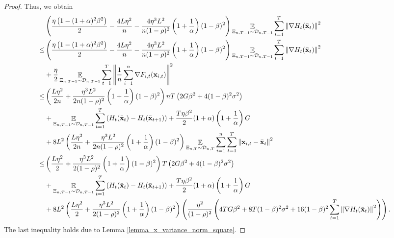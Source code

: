 \documentclass{article}
\begin{document}
\begin{proof}
Thus, we obtain
\begin{align}
\nonumber
& \left( \frac{\eta\left(  1-(1+\alpha)^2\beta^2  \right)}{2} - \frac{4L\eta^2}{n} - \frac{4\eta^3 L^2}{n(1-\rho)^2} \left( 1+\frac{1}{\alpha} \right)(1-\beta)^2 \right) \mathop{\mathbb{E}}_{ \Xi_{n,T-1} \sim \mathcal{D}_{n,T-1} }\sum_{t=1}^T\left\lVert\nabla H_t(\bar{{\bf x}}_t)\right\rVert^2 \\ \nonumber 
\le & \left( \frac{\eta\left(  1-(1+\alpha)^2\beta^2  \right)}{2} - \frac{4L\eta^2}{n} - \frac{4\eta^3 L^2}{n(1-\rho)^2} \left( 1+\frac{1}{\alpha} \right)(1-\beta)^2 \right) \mathop{\mathbb{E}}_{ \Xi_{n,T-1} \sim \mathcal{D}_{n,T-1} }\sum_{t=1}^T\left\lVert\nabla H_t(\bar{{\bf x}}_t)\right\rVert^2 \\ \nonumber 
&+ \frac{\eta}{2}  \mathop{\mathbb{E}}_{ \Xi_{n,T-1} \sim \mathcal{D}_{n,T-1} }\sum_{t=1}^T\left\lVert\frac{1}{n}\sum_{i=1}^n \nabla F_{i,t}({\bf x}_{i,t})\right\rVert^2 \\ \nonumber 
\le &  \left( \frac{L\eta^2}{2n} + \frac{\eta^3 L^2}{2n(1-\rho)^2} \left( 1+\frac{1}{\alpha} \right)(1-\beta)^2  \right) n T \left(  2G\beta^2  +  4(1-\beta)^2 \sigma^2  \right) \\ \nonumber
& + \mathop{\mathbb{E}}_{ \Xi_{n,T-1} \sim \mathcal{D}_{n,T-1} } \sum_{t=1}^T \left(  H_t(\bar{{\bf x}}_t) -  H_t(\bar{{\bf x}}_{t+1})  \right) + \frac{T \eta \beta^2}{2} (1+\alpha) \left( 1+\frac{1}{\alpha} \right)  G \\ \nonumber
& + 8L^2\left( \frac{L\eta^2}{2n} + \frac{\eta^3 L^2}{2n(1-\rho)^2} \left( 1+\frac{1}{\alpha} \right)(1-\beta)^2  \right) \mathop{\mathbb{E}}_{ \Xi_{n,T} \sim \mathcal{D}_{n,T} } \sum_{i=1}^n \sum_{t=1}^T \left\lVert {\bf x}_{i,t} - \bar{{\bf x}}_t \right\rVert^2  \\ \nonumber
\le &  \left( \frac{L\eta^2}{2} + \frac{\eta^3 L^2}{2(1-\rho)^2} \left( 1+\frac{1}{\alpha} \right)(1-\beta)^2  \right)  T \left(  2G\beta^2  +  4(1-\beta)^2 \sigma^2  \right) \\ \nonumber
& + \mathop{\mathbb{E}}_{ \Xi_{n,T-1} \sim \mathcal{D}_{n,T-1} } \sum_{t=1}^T \left(  H_t(\bar{{\bf x}}_t) -  H_t(\bar{{\bf x}}_{t+1})  \right) + \frac{T \eta \beta^2}{2} (1+\alpha) \left( 1+\frac{1}{\alpha} \right)  G \\ \nonumber
& + 8L^2\left( \frac{L\eta^2}{2} + \frac{\eta^3 L^2}{2(1-\rho)^2} \left( 1+\frac{1}{\alpha} \right)(1-\beta)^2  \right) \left(  \frac{\eta^2}{(1-\rho)^2} \left(  4TG\beta^2  +  8T(1-\beta)^2 \sigma^2 + 16(1-\beta)^2 \sum_{t=1}^T \left\lVert\nabla H_t(\bar{{\bf x}}_t)\right\rVert^2  \right)   \right). 
\end{align} The last inequality holds due to Lemma \ref{lemma_x_variance_norm_square}.


\end{proof}
\end{document}
